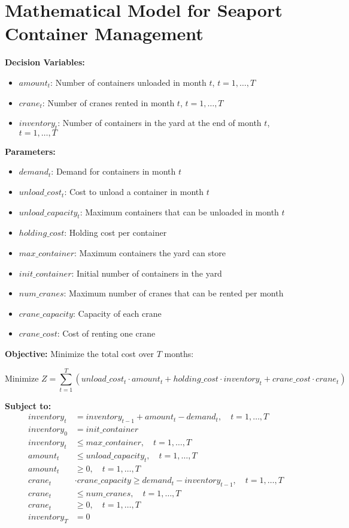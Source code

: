 \documentclass{article}
\begin{document}
\section*{Mathematical Model for Seaport Container Management}

\textbf{Decision Variables:}
\begin{itemize}
    \item \( amount_t \): Number of containers unloaded in month \( t \), \( t = 1, \ldots, T \)
    \item \( crane_t \): Number of cranes rented in month \( t \), \( t = 1, \ldots, T \)
    \item \( inventory_t \): Number of containers in the yard at the end of month \( t \), \( t = 1, \ldots, T \)
\end{itemize}

\textbf{Parameters:}
\begin{itemize}
    \item \( demand_t \): Demand for containers in month \( t \)
    \item \( unload\_cost_t \): Cost to unload a container in month \( t \)
    \item \( unload\_capacity_t \): Maximum containers that can be unloaded in month \( t \)
    \item \( holding\_cost \): Holding cost per container
    \item \( max\_container \): Maximum containers the yard can store
    \item \( init\_container \): Initial number of containers in the yard
    \item \( num\_cranes \): Maximum number of cranes that can be rented per month
    \item \( crane\_capacity \): Capacity of each crane
    \item \( crane\_cost \): Cost of renting one crane
\end{itemize}

\textbf{Objective:} Minimize the total cost over \( T \) months:

\[
\text{Minimize } Z = \sum_{t=1}^{T} \left( unload\_cost_t \cdot amount_t + holding\_cost \cdot inventory_t + crane\_cost \cdot crane_t \right)
\]

\textbf{Subject to:}
\begin{align}
    inventory_t & = inventory_{t-1} + amount_t - demand_t, \quad t = 1, \ldots, T \\
    inventory_0 & = init\_container \\
    inventory_t & \leq max\_container, \quad t = 1, \ldots, T \\
    amount_t & \leq unload\_capacity_t, \quad t = 1, \ldots, T \\
    amount_t & \geq 0, \quad t = 1, \ldots, T \\
    crane_t & \cdot crane\_capacity \geq demand_t - inventory_{t-1}, \quad t = 1, \ldots, T \\
    crane_t & \leq num\_cranes, \quad t = 1, \ldots, T \\
    crane_t & \geq 0, \quad t = 1, \ldots, T \\
    inventory_T & = 0 
\end{align}
\end{document}
